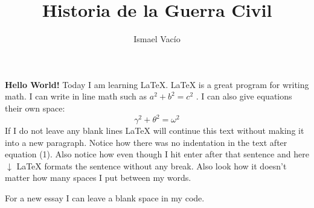 \documentclass{report} %
\title{Historia de la Guerra Civil} %
\author{Ismael Vacío} %
\begin{document}

\maketitle %





\textbf{Hello World!} Today I am learning \LaTeX. %
\LaTeX{} is a great program for writing math. I can write in line math such as $a^2+b^2=c^2$ %
. I can also give equations their own space:
\begin{equation} %
  \gamma^2+\theta^2=\omega^2
\end{equation}
If I do not leave any blank lines \LaTeX{} will continue  this text without making it into a new paragraph.  Notice how there was no indentation in the text after equation (1).
Also notice how even though I hit enter after that sentence and here $\downarrow$
\LaTeX{} formats the sentence without any break.  Also   look  how      it   doesn't     matter          how    many  spaces     I put     between       my    words.

For a new essay I can leave a blank space in my code.
\end{document}
